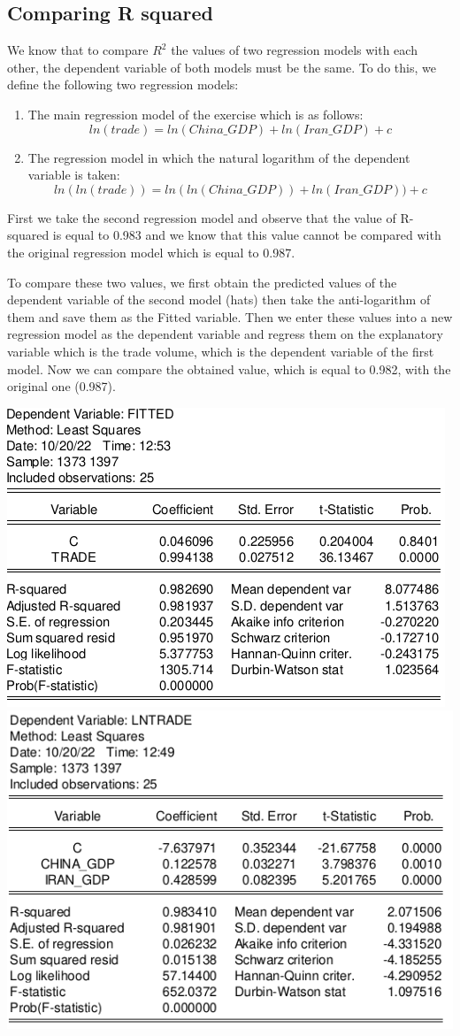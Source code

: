 \documentclass[12pt, letterpaper, twoside]{article}
\begin{document}
\subsection{Comparing R squared}
We know that to compare \(R^2\) the values of two regression models with each other, the dependent variable of both models must be the same.
To do this, we define the following two regression models:
\begin{enumerate}
  \item The main regression model of the exercise which is as follows:
  \[ln(trade)=ln(China{\_}GDP)+ln(Iran{\_}GDP)+c\]
  \item The regression model in which the natural logarithm of the dependent variable is taken: 
    \[ln(ln(trade))=ln(ln(China{\_}GDP))+ln(Iran{\_}GDP))+c\]
\end{enumerate}
First we take the second regression model and observe that the value of R-squared is equal to 0.983 and we know that this value cannot be compared with the original regression model which is equal to 0.987.

To compare these two values, we first obtain the predicted values of the dependent variable of the second model (hats) then take the anti-logarithm of them and save them as the Fitted variable. Then we enter these values into a new regression model as the dependent variable and regress them on the explanatory variable which is the trade volume, which is the dependent variable of the first model. Now we can compare the obtained value, which is equal to 0.982, with the original one (0.987).

    \includegraphics[width=.6\textwidth,height=.6\textwidth,keepaspectratio,center]{5.png}
        \includegraphics[width=.6\textwidth,height=.6\textwidth,keepaspectratio,center]{6.png}
\end{document}
